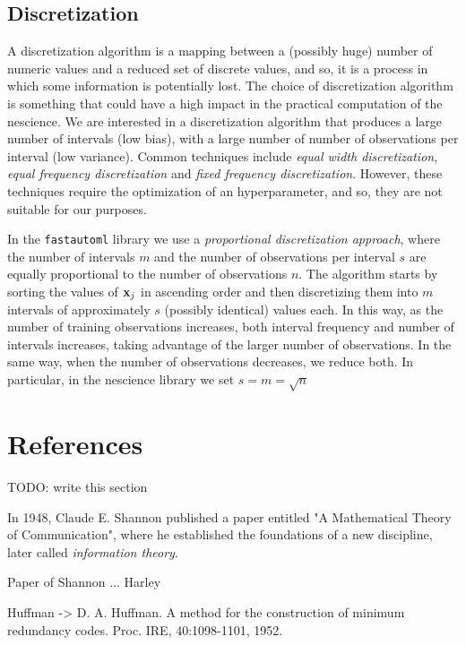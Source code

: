 \subsection{Discretization}

A discretization algorithm is a mapping between a (possibly huge) number of numeric values and a reduced set of discrete values, and so, it is a process in which some information is potentially lost. The choice of discretization algorithm is something that could have a high impact in the practical computation of the nescience. We are interested in a discretization algorithm that produces a large number of intervals (low bias), with a large number of number of observations per interval (low variance). Common techniques include \emph{equal width discretization}, \emph{equal frequency discretization} and \emph{fixed frequency discretization}. However, these techniques require the optimization of an hyperparameter, and so, they are not suitable for our purposes.





In the \texttt{fastautoml} library we use a \emph{proportional discretization approach}, where the number of intervals $m$ and the number of observations per interval $s$ are equally proportional to the number of observations $n$. The algorithm starts by sorting the values of $\bold{x}_j$ in ascending order and then discretizing them into $m$ intervals of approximately $s$ (possibly identical) values each. In this way, as the number of training observations increases, both interval frequency and number of intervals increases, taking advantage of the larger number of observations. In the same way, when the number of observations decreases, we reduce both. In particular, in the nescience library we set $s = m = \sqrt{n}$


\section*{References}

{\color{red} TODO: write this section}

In 1948, Claude E. Shannon published a paper entitled "A Mathematical Theory of Communication", where he established the foundations of a new discipline, later called \emph{information theory}.

Paper of Shannon ... Harley

Huffman -> D. A. Huffman. A method for the construction of minimum redundancy codes. Proc. IRE, 40:1098-1101, 1952.

